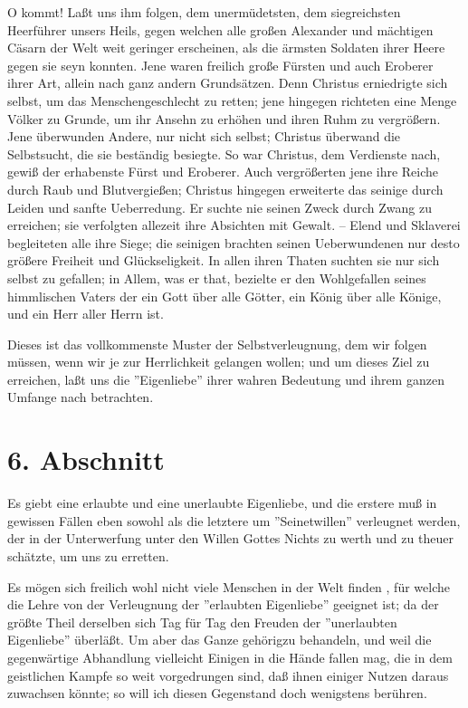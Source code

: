 O kommt! Laßt uns ihm folgen, dem unermüdetsten, dem siegreichsten Heerführer unsers Heils, gegen welchen alle großen Alexander und mächtigen Cäsarn der Welt weit geringer erscheinen, als die ärmsten Soldaten ihrer Heere gegen sie seyn konnten. Jene waren freilich große Fürsten und auch Eroberer ihrer Art, allein nach ganz andern Grundsätzen. Denn Christus erniedrigte sich selbst, um das Menschengeschlecht zu retten; jene hingegen richteten eine Menge Völker zu Grunde, um ihr Ansehn zu erhöhen und ihren Ruhm zu vergrößern. Jene überwunden Andere, nur nicht sich selbst; Christus überwand die Selbstsucht, die sie beständig besiegte. So war Christus, dem Verdienste nach, gewiß der erhabenste Fürst und Eroberer. Auch vergrößerten jene ihre Reiche durch Raub und Blutvergießen; Christus hingegen erweiterte das seinige durch Leiden und sanfte Ueberredung. Er suchte nie seinen Zweck durch Zwang zu erreichen; sie verfolgten allezeit ihre Absichten mit Gewalt. -- Elend und Sklaverei begleiteten alle ihre Siege; die seinigen brachten seinen Ueberwundenen nur desto größere Freiheit und Glückseligkeit. In allen ihren Thaten suchten sie nur sich selbst zu gefallen; in Allem, was er that, bezielte er den Wohlgefallen seines himmlischen Vaters der ein Gott über alle Götter, ein König über alle Könige, und ein Herr aller Herrn ist.

Dieses ist das vollkommenste Muster der Selbstverleugnung, dem wir folgen müssen, wenn wir je zur Herrlichkeit gelangen wollen; und um dieses Ziel zu erreichen, laßt uns die ''Eigenliebe'' ihrer wahren Bedeutung und ihrem ganzen Umfange nach betrachten.

\section{6. Abschnitt}

Es giebt eine erlaubte und eine unerlaubte Eigenliebe, und die erstere muß in gewissen Fällen eben sowohl als die letztere um ''Seinetwillen'' verleugnet werden, der in der Unterwerfung unter den Willen Gottes Nichts zu werth und zu theuer schätzte, um uns zu erretten.

Es mögen sich freilich wohl nicht viele Menschen in der Welt finden , für welche die Lehre von der Verleugnung der ''erlaubten Eigenliebe'' geeignet ist; da der größte Theil derselben sich Tag für Tag den Freuden der ''unerlaubten Eigenliebe'' überläßt. Um aber das Ganze gehörigzu behandeln, und weil die gegenwärtige Abhandlung vielleicht Einigen in die Hände fallen mag, die in dem geistlichen Kampfe so weit vorgedrungen sind, daß ihnen einiger Nutzen daraus zuwachsen könnte; so will ich diesen Gegenstand doch wenigstens berühren.


